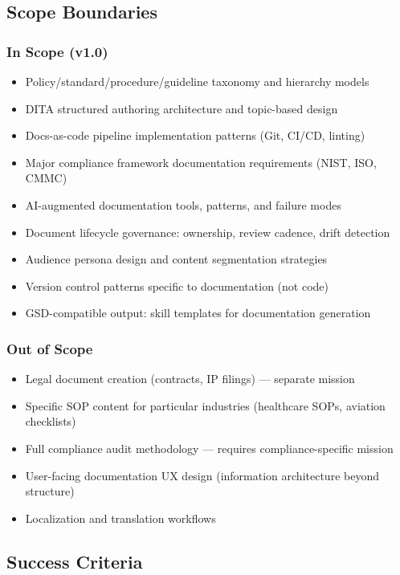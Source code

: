 \documentclass[11pt,letterpaper]{article}
\begin{document}
\subsection{Scope Boundaries}

\subsubsection{In Scope (v1.0)}
\begin{itemize}[leftmargin=*]
  \item Policy/standard/procedure/guideline taxonomy and hierarchy models
  \item DITA structured authoring architecture and topic-based design
  \item Docs-as-code pipeline implementation patterns (Git, CI/CD, linting)
  \item Major compliance framework documentation requirements (NIST, ISO, CMMC)
  \item AI-augmented documentation tools, patterns, and failure modes
  \item Document lifecycle governance: ownership, review cadence, drift detection
  \item Audience persona design and content segmentation strategies
  \item Version control patterns specific to documentation (not code)
  \item GSD-compatible output: skill templates for documentation generation
\end{itemize}

\subsubsection{Out of Scope}
\begin{itemize}[leftmargin=*]
  \item Legal document creation (contracts, IP filings) --- separate mission
  \item Specific SOP content for particular industries (healthcare SOPs, aviation checklists)
  \item Full compliance audit methodology --- requires compliance-specific mission
  \item User-facing documentation UX design (information architecture beyond structure)
  \item Localization and translation workflows
\end{itemize}

\subsection{Success Criteria}
\end{document}
